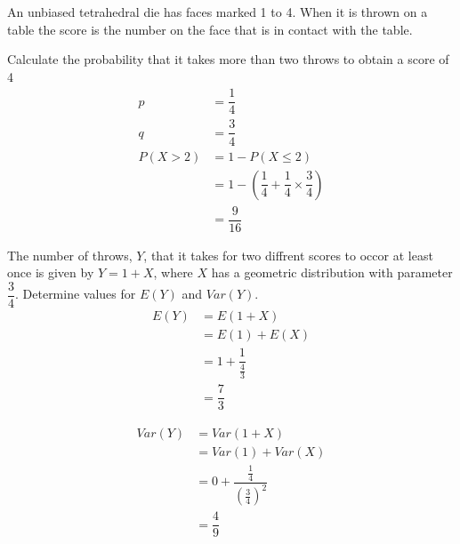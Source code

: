         \begin{example}
        {
            An unbiased tetrahedral die has faces marked 1 to 4. When it is thrown on a table the score is the number on the face that is in contact with the table.
        }

            \begin{step}{Calculate the probability that it takes more than two throws to obtain a score of 4}
                \begin{align*}
                    p &= \dfrac{1}{4}                                                        \\
                    q &= \dfrac{3}{4}                                                        \\
                P(X > 2) &= 1 - P(X \leq 2)                                                     \\
                        &= 1 - \left(\dfrac{1}{4} + \dfrac{1}{4} \times \dfrac{3}{4}\right)    \\
                        &= \dfrac{9}{16}
                \end{align*}
            \end{step}

            \begin{step}{The number of throws, $Y$, that it takes for two diffrent scores to occor at least once is given by $Y = 1 + X$, where $X$ has a geometric distribution with parameter $\dfrac{3}{4}$. Determine values for $E(Y)$ and $Var(Y)$.}
                \begin{align*}
                E(Y) &= E(1+X)                          \\
                    &= E(1) + E(X)                     \\
                    &= 1 + \dfrac{1}{\frac{4}{3}}      \\
                    &= \dfrac{7}{3}                    
                \end{align*}

                \begin{align*}
                Var(Y) &= Var(1+X)                                  \\
                    &= Var(1) + Var(X)                           \\
                    &= 0 + \dfrac{\frac{1}{4}}{(\frac{3}{4})^2}  \\
                    &= \dfrac{4}{9}
                \end{align*}
            \end{step}
        \end{example}

